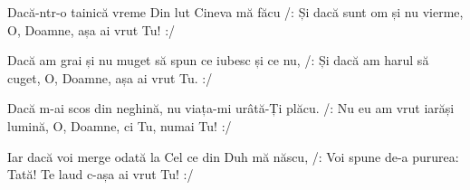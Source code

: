 
\beginverse
Dacă-ntr-o tainică vreme
Din lut Cineva mă făcu
/: Și dacă sunt om și nu vierme,
O, Doamne, așa ai vrut Tu! :/
\endverse

\beginverse
Dacă am grai și nu muget
să spun ce iubesc și ce nu,
/: Și dacă am harul să cuget,
O, Doamne, așa ai vrut Tu. :/
\endverse

\beginverse
Dacă m-ai scos din neghină,
nu viața-mi urâtă-Ți plăcu.
/: Nu eu am vrut iarăși lumină,
O, Doamne, ci Tu, numai Tu! :/
\endverse

\beginverse
Iar dacă voi merge odată
la Cel ce din Duh mă născu,
/: Voi spune de-a pururea: Tată!
Te laud c-așa ai vrut Tu! :/
\endverse

\endsong
